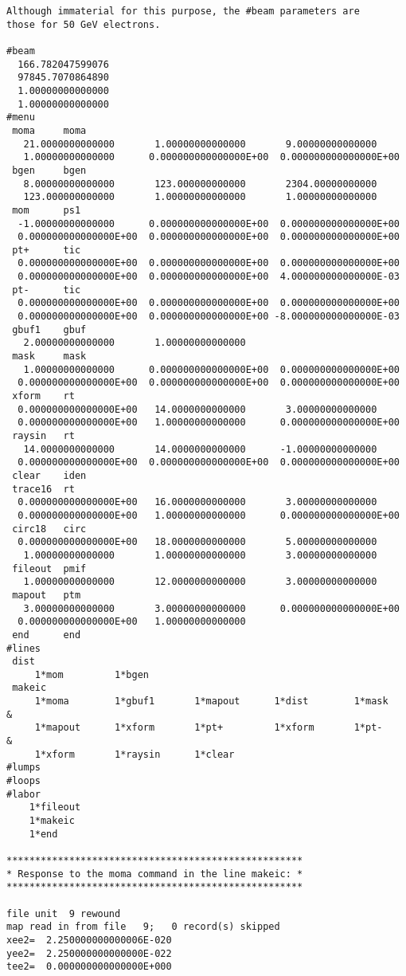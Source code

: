 \begin{footnotesize}
\begin{verbatim}
Although immaterial for this purpose, the #beam parameters are
those for 50 GeV electrons.

#beam
  166.782047599076
  97845.7070864890
  1.00000000000000
  1.00000000000000
#menu
 moma     moma
   21.0000000000000       1.00000000000000       9.00000000000000
   1.00000000000000      0.000000000000000E+00  0.000000000000000E+00
 bgen     bgen
   8.00000000000000       123.000000000000       2304.00000000000
   123.000000000000       1.00000000000000       1.00000000000000
 mom      ps1
  -1.00000000000000      0.000000000000000E+00  0.000000000000000E+00
  0.000000000000000E+00  0.000000000000000E+00  0.000000000000000E+00
 pt+      tic
  0.000000000000000E+00  0.000000000000000E+00  0.000000000000000E+00
  0.000000000000000E+00  0.000000000000000E+00  4.000000000000000E-03
 pt-      tic
  0.000000000000000E+00  0.000000000000000E+00  0.000000000000000E+00
  0.000000000000000E+00  0.000000000000000E+00 -8.000000000000000E-03
 gbuf1    gbuf
   2.00000000000000       1.00000000000000
 mask     mask
   1.00000000000000      0.000000000000000E+00  0.000000000000000E+00
  0.000000000000000E+00  0.000000000000000E+00  0.000000000000000E+00
 xform    rt
  0.000000000000000E+00   14.0000000000000       3.00000000000000
  0.000000000000000E+00   1.00000000000000      0.000000000000000E+00
 raysin   rt
   14.0000000000000       14.0000000000000      -1.00000000000000
  0.000000000000000E+00  0.000000000000000E+00  0.000000000000000E+00
 clear    iden
 trace16  rt
  0.000000000000000E+00   16.0000000000000       3.00000000000000
  0.000000000000000E+00   1.00000000000000      0.000000000000000E+00
 circ18   circ
  0.000000000000000E+00   18.0000000000000       5.00000000000000
   1.00000000000000       1.00000000000000       3.00000000000000
 fileout  pmif
   1.00000000000000       12.0000000000000       3.00000000000000
 mapout   ptm
   3.00000000000000       3.00000000000000      0.000000000000000E+00
  0.000000000000000E+00   1.00000000000000
 end      end
#lines
 dist
     1*mom         1*bgen
 makeic
     1*moma        1*gbuf1       1*mapout      1*dist        1*mask     &
     1*mapout      1*xform       1*pt+         1*xform       1*pt-      &
     1*xform       1*raysin      1*clear
#lumps
#loops
#labor
    1*fileout
    1*makeic
    1*end

****************************************************
* Response to the moma command in the line makeic: *
****************************************************

file unit  9 rewound
map read in from file   9;   0 record(s) skipped
xee2=  2.250000000000006E-020
yee2=  2.250000000000000E-022
tee2=  0.000000000000000E+000


\end{verbatim}
\end{footnotesize}
